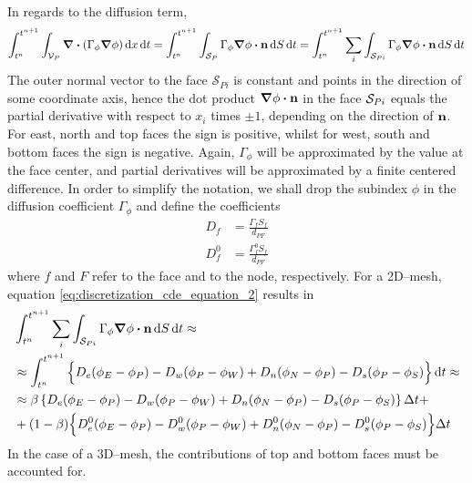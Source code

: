 In regards to the diffusion term,
\begin{equation} \label{eq:discretization_cde_equation_2}
	\int_{t^n}^{t^{n+1}} \int_{\cv{P}} \div(\Gamma_\phi \grad{\phi}) \dd{x} \dd{t} = 
	\int_{t^n}^{t^{n+1}} \int_{\cs{P}} \Gamma_\phi \grad{\phi} \vdot \vb{n} \dd{S} \dd{t} = 
	\int_{t^n}^{t^{n+1}} \sum_i \int_{\cs{Pi}} \Gamma_\phi \grad{\phi} \vdot \vb{n} \dd{S} \dd{t}
\end{equation}
The outer normal vector to the face $\mathcal{S}_{Pi}$ is constant and points in
the direction of some coordinate axis, hence the dot product $\grad{\phi} \vdot
\vb{n}$ in the face $\mathcal{S}_{Pi}$ equals the partial derivative with respect to
$x_i$ times $\pm 1$, depending on the direction of $\vb{n}$. For east, north and
top faces the sign is positive, whilst for west, south and bottom faces the sign
is negative. Again, $\Gamma_\phi$ will be approximated by the value at the face
center, and partial derivatives will be approximated by a finite centered
difference. In order to simplify the notation, we shall drop the subindex $\phi$ in the diffusion
coefficient $\Gamma_\phi$ and define the coefficients
\begin{align}
	D_f &= \frac{\Gamma_f S_f}{d_{PF}} \label{eq:coefficient_df} \\
	D_f^0 &= \frac{\Gamma_f^0 S_f}{d_{PF}}
\end{align}
where $f$ and $F$ refer to the face and to the node, respectively. For a 2D--mesh, equation
\eqref{eq:discretization_cde_equation_2} results in
\begin{align}
	&\int_{t^n}^{t^{n+1}} \sum_i \int_{\cs{Pi}} \Gamma_\phi \grad{\phi} \vdot \vb{n} \dd{S} \dd{t} 
	\approx \nonumber \\ 
	&\approx 
	\int_{t^n}^{t^{n+1}}
	\Big\{ 
	D_e (\phi_E - \phi_P) - D_w (\phi_P - \phi_W) + D_n (\phi_N - \phi_P) - D_s (\phi_P - \phi_S) 
	\Big\} \dd{t} \approx \nonumber \\
	&\approx
	\beta 
	\left\{ 
		D_e (\phi_E - \phi_P) - D_w (\phi_P - \phi_W) + D_n (\phi_N - \phi_P) - D_s (\phi_P - \phi_S) 
	\right\} \Delta t + \nonumber \\
	&+ (1 - \beta)
	\Big\{ 
		D_e^0 (\phi_E - \phi_P) - D_w^0 (\phi_P - \phi_W) + D_n^0 (\phi_N - \phi_P) - D_s^0 (\phi_P - \phi_S) 
	\Big\} \Delta t
\end{align}
In the case of a 3D--mesh, the contributions of top and bottom faces must be
accounted for.

